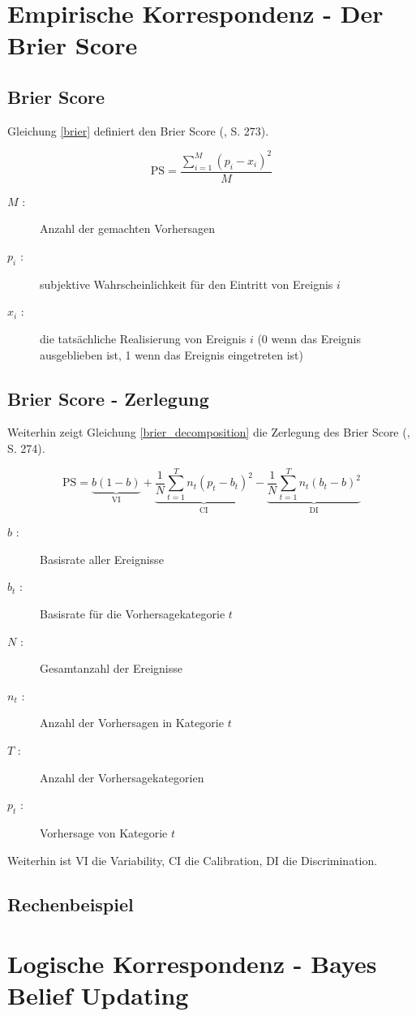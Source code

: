 \section{Empirische Korrespondenz - Der Brier Score} \label{Anhang_Brier}

\subsection{Brier Score}

Gleichung \ref{brier} definiert den Brier Score (\cite{Tetlock}, S. 273).

\begin{equation}
\textrm{PS} = \frac{\sum_{i=1}^{M} (p_i - x_i)^2}{ M }
\label{brier}
\end{equation}

\begin{description}
\item[$M$ :] Anzahl der gemachten Vorhersagen
\item[$p_i$ :] subjektive Wahrscheinlichkeit für den Eintritt von Ereignis $i$
\item[$x_i$ :] die tatsächliche Realisierung von Ereignis $i$ (0 wenn das Ereignis ausgeblieben ist, 1 wenn das Ereignis eingetreten ist)
\end{description}

\subsection{Brier Score - Zerlegung}

Weiterhin zeigt Gleichung \ref{brier_decomposition} die Zerlegung des Brier Score (\cite{Tetlock}, S. 274).

\begin{equation}
\textrm{PS} = \underbrace{
b(1-b)
}_\textrm{VI} + \underbrace{
\frac{1}{N} \sum_{t=1}^{T} n_t (p_t - b_t)^2
}_\textrm{CI} - \underbrace{
\frac{1}{N} \sum_{t=1}^{T} n_t (b_t - b)^2
}_\textrm{DI}
\label{brier_decomposition}
\end{equation}

\begin{description}
\item[$b$ :] Basisrate aller Ereignisse
\item[$b_t$ :] Basisrate für die Vorhersagekategorie $t$
\item[$N$ :] Gesamtanzahl der Ereignisse
\item[$n_t$ :] Anzahl der Vorhersagen in Kategorie $t$
\item[$T$ :] Anzahl der Vorhersagekategorien
\item[$p_t$ :] Vorhersage von Kategorie $t$
\end{description}

Weiterhin ist VI die Variability, CI die Calibration, DI die Discrimination.

\subsection{Rechenbeispiel}


\section{Logische Korrespondenz - Bayes Belief Updating} \label{Anhang_Bayes}

